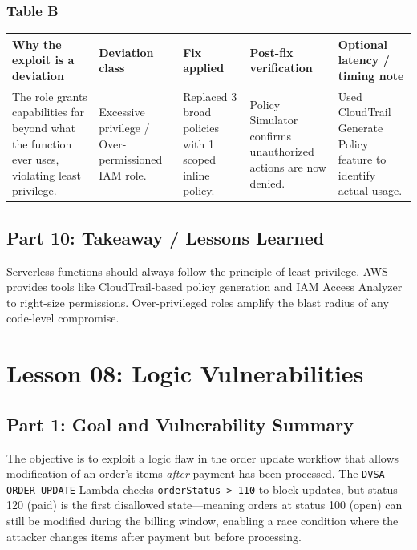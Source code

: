 \documentclass[12pt]{report}
\begin{document}
\subsection*{Table B}
\begin{table}[H]
  \footnotesize
  \centering
  \begin{tabularx}{\textwidth}{|Y|Y|Y|Y|Y|}
    \hline
    \textbf{Why the exploit is a deviation} & \textbf{Deviation class} & \textbf{Fix applied} & \textbf{Post-fix verification} & \textbf{Optional latency / timing note} \\
    \hline
    The role grants capabilities far beyond what the function ever uses, violating least privilege. &
    Excessive privilege / Over-permissioned IAM role. &
    Replaced 3 broad policies with 1 scoped inline policy. &
    Policy Simulator confirms unauthorized actions are now denied. &
    Used CloudTrail Generate Policy feature to identify actual usage. \\
    \hline
  \end{tabularx}
\end{table}

\section{Part 10: Takeaway / Lessons Learned}
Serverless functions should always follow the principle of least privilege. AWS provides tools like CloudTrail-based policy generation and IAM Access Analyzer to right-size permissions. Over-privileged roles amplify the blast radius of any code-level compromise.

\clearpage

\chapter{Lesson 08: Logic Vulnerabilities}

\section{Part 1: Goal and Vulnerability Summary}
The objective is to exploit a logic flaw in the order update workflow that allows modification of an order's items \emph{after} payment has been processed. The \texttt{DVSA-ORDER-UPDATE} Lambda checks \texttt{orderStatus > 110} to block updates, but status 120 (paid) is the first disallowed state---meaning orders at status 100 (open) can still be modified during the billing window, enabling a race condition where the attacker changes items after payment but before processing.
\end{document}
